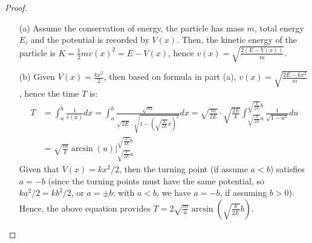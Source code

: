 \documentclass{article}
\begin{document}
\begin{proof}
    \hfill

    \begin{itemize}
        \item[(a)] Assume the conservation of energy, the particle has mass $m$, total energy $E$, and the potential is recorded by $V(x)$. Then, the kinetic energy of the particle is $K=\frac{1}{2}mv(x)^2=E-V(x)$, hence $v(x)=\sqrt{\frac{2(E-V(x))}{m}}$.
        \item[(b)] Given $V(x)=\frac{kx^2}{2}$,  then based on formula in part (a), $v(x)=\sqrt{\frac{2E-kx^2}{m}}$, hence the time $T$ is:
        \begin{align}
            T&=\int_{a}^{b}\frac{1}{v(x)}dx = \int_{a}^{b}\frac{\sqrt{m}}{\sqrt{2E}\cdot \sqrt{1-\left(\sqrt{\frac{k}{2E}}x\right)^2}}dx = \sqrt{\frac{m}{2E}}\cdot\sqrt{\frac{2E}{k}}\int_{\sqrt{\frac{k}{2E}}a}^{\sqrt{\frac{k}{2E}}b}\frac{1}{\sqrt{1-u^2}}du\\
            &= \sqrt{\frac{m}{k}}\arcsin(u)\bigg|_{\sqrt{\frac{k}{2E}}a}^{\sqrt{\frac{k}{2E}}b}
        \end{align}
        Given that $V(x)=kx^2/2$, then the turning point (if assume $a<b$) satisfies $a=-b$ (since the turning points must have the same potential, so $ka^2/2=kb^2/2$, or $a=\pm b$; with $a<b$, we have $a=-b$, if assuming $b>0$). Hence, the above equation provides $T=2\sqrt{\frac{m}{k}}\arcsin\left(\sqrt{\frac{k}{2E}}b\right)$.


\end{itemize}
\end{proof}
\end{document}
